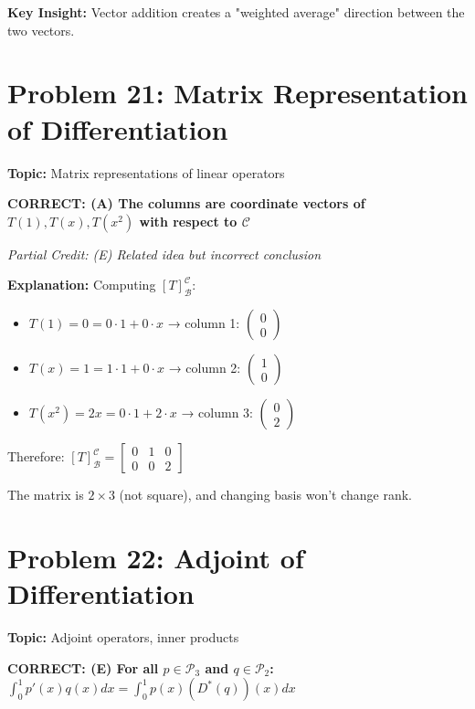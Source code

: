 \documentclass[12pt]{amsart}
\newcommand{\correct}[1]{{\color{blue}\textbf{CORRECT: #1}}}
\newcommand{\partcred}[1]{{\color{red}\textit{Partial Credit: #1}}}
\newcommand{\hint}{\textbf{Key Insight: }}
\begin{document}
\hint Vector addition creates a "weighted average" direction between the two vectors.

\hrulefill

\section*{Problem 21: Matrix Representation of Differentiation}
\textbf{Topic:} Matrix representations of linear operators

\correct{(A) The columns are coordinate vectors of $T(1), T(x), T(x^2)$ with respect to $\mathcal{C}$}

\partcred{(E) Related idea but incorrect conclusion}

\textbf{Explanation:} 
Computing $[T]_{\mathcal{B}}^{\mathcal{C}}$:

\begin{itemize}
\item $T(1) = 0 = 0 \cdot 1 + 0 \cdot x$ → column 1: $\begin{pmatrix}0\\0\end{pmatrix}$
\item $T(x) = 1 = 1 \cdot 1 + 0 \cdot x$ → column 2: $\begin{pmatrix}1\\0\end{pmatrix}$
\item $T(x^2) = 2x = 0 \cdot 1 + 2 \cdot x$ → column 3: $\begin{pmatrix}0\\2\end{pmatrix}$
\end{itemize}

Therefore: $[T]_{\mathcal{B}}^{\mathcal{C}} = \begin{bmatrix} 0 & 1 & 0 \\ 0 & 0 & 2 \end{bmatrix}$

The matrix is $2 \times 3$ (not square), and changing basis won't change rank.

\hrulefill

\section*{Problem 22: Adjoint of Differentiation}
\textbf{Topic:} Adjoint operators, inner products

\correct{(E) For all $p \in \mathcal{P}_3$ and $q \in \mathcal{P}_2$: $\int_0^1 p'(x)q(x)dx = \int_0^1 p(x)(D^*(q))(x)dx$}
\end{document}
